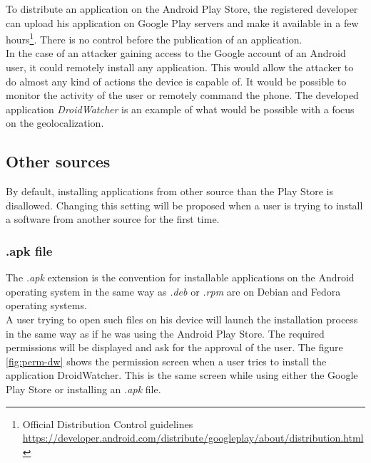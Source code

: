 To distribute an application on the Android Play Store, the registered developer can upload his application on Google Play servers and make it available in a few hours\footnote{Official Distribution Control guidelines \url{https://developer.android.com/distribute/googleplay/about/distribution.html}}.
There is no control before the publication of an application.\\

In the case of an attacker gaining access to the Google account of an Android user, it could remotely install any application.
This would allow the attacker to do almost any kind of actions the device is capable of.
It would be possible to monitor the activity of the user or remotely command the phone.
The developed application \emph{DroidWatcher} is an example of what would be possible with a focus on the geolocalization.


\subsection{Other sources}
By default, installing applications from other source than the Play Store is disallowed.
Changing this setting will be proposed when a user is trying to install a software from another source for the first time.

\subsubsection{.apk file}
The \emph{.apk} extension is the convention for installable applications on the Android operating system in the same way as \emph{.deb} or \emph{.rpm} are on Debian and Fedora operating systems.\\

A user trying to open such files on his device will launch the installation process in the same way as if he was using the Android Play Store.
The required permissions will be displayed and ask for the approval of the user.
The figure \ref{fig:perm-dw} shows the permission screen when a user tries to install the application DroidWatcher.
This is the same screen while using either the Google Play Store or installing an \emph{.apk} file.\\

